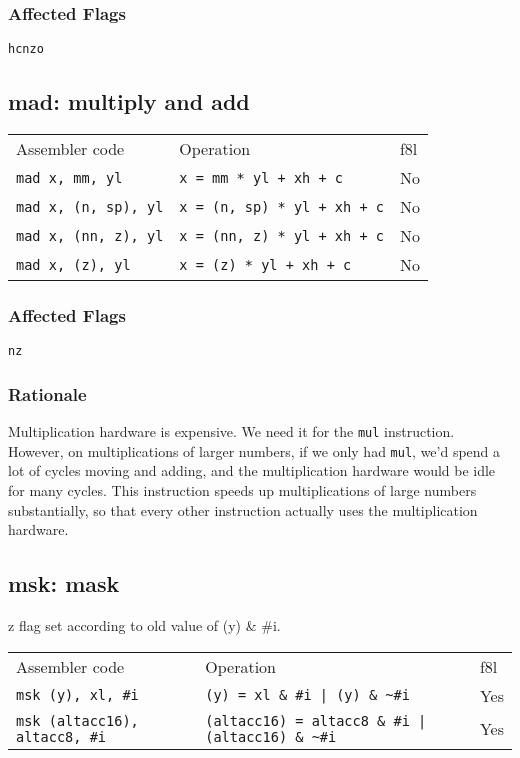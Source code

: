 \documentclass{book}
\begin{document}
\subsubsection*{Affected Flags}

\texttt{hcnzo}


\subsection{mad: multiply and add}

\begin{tabular}{l l l}
Assembler code              & Operation                          & f8l \\
\texttt{mad x, mm, yl}      & \texttt{x = mm * yl + xh + c}      & No \\
\texttt{mad x, (n, sp), yl} & \texttt{x = (n, sp) * yl + xh + c} & No \\
\texttt{mad x, (nn, z), yl} & \texttt{x = (nn, z) * yl + xh + c} & No \\
\texttt{mad x, (z), yl}     & \texttt{x = (z) * yl + xh + c}     & No \\
\end{tabular}

\subsubsection*{Affected Flags}

\texttt{nz}

\subsubsection*{Rationale}

Multiplication hardware is expensive. We need it for the \texttt{mul} instruction. However, on multiplications of larger numbers, if we only had \texttt{mul}, we'd spend a lot of cycles moving and adding, and the multiplication hardware would be idle for many cycles. This instruction speeds up multiplications of large numbers substantially, so that every other instruction actually uses the multiplication hardware.


\subsection{msk: mask}

z flag set according to old value of  (y) \& \#i.

\begin{tabular}{l l l}
Assembler code                        & Operation                                                    & f8l \\
\texttt{msk (y), xl, \#i}             & \texttt{(y) = xl \& \#i | (y) \& \~{}\#i}                    & Yes \\
\texttt{msk (altacc16), altacc8, \#i} & \texttt{(altacc16) = altacc8 \& \#i | (altacc16) \& \~{}\#i} & Yes \\
\end{tabular}
\end{document}
